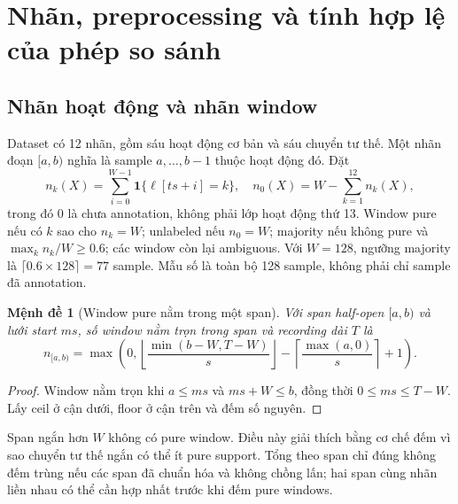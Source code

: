 \documentclass[11pt,a4paper]{article}
\newcommand{\ind}{\mathbf 1}
\newtheorem{proposition}[definition]{Mệnh đề}
\theoremstyle{remark}
\begin{document}
\section{Nhãn, preprocessing và tính hợp lệ của phép so sánh}
\subsection{Nhãn hoạt động và nhãn window}
Dataset có 12 nhãn, gồm sáu hoạt động cơ bản và sáu chuyển tư thế. Một nhãn
đoạn $[a,b)$ nghĩa là sample $a,\ldots,b-1$ thuộc hoạt động đó. Đặt
\begin{equation}
 n_k(X)=\sum_{i=0}^{W-1}\ind\{\ell[ts+i]=k\},\quad
 n_0(X)=W-\sum_{k=1}^{12}n_k(X),
\end{equation}
trong đó $0$ là chưa annotation, không phải lớp hoạt động thứ 13.
Window pure nếu có $k$ sao cho $n_k=W$; unlabeled nếu $n_0=W$;
majority nếu không pure và $\max_k n_k/W\ge0.6$; các window còn lại
ambiguous. Với $W=128$, ngưỡng majority là $\lceil0.6\times128\rceil=77$
sample. Mẫu số là toàn bộ 128 sample, không phải chỉ sample đã annotation.

\begin{proposition}[Window pure nằm trong một span]
Với span half-open $[a,b)$ và lưới start $ms$, số window nằm trọn trong
span và recording dài $T$ là
\begin{equation}
 n_{[a,b)}=\max\left(0,
 \left\lfloor\frac{\min(b-W,T-W)}s\right\rfloor
 -\left\lceil\frac{\max(a,0)}s\right\rceil+1\right).
\end{equation}
\end{proposition}
\begin{proof}
Window nằm trọn khi $a\le ms$ và $ms+W\le b$, đồng thời
$0\le ms\le T-W$. Lấy ceil ở cận dưới, floor ở cận trên và đếm số nguyên.
\end{proof}
Span ngắn hơn $W$ không có pure window. Điều này giải thích bằng cơ chế
đếm vì sao chuyển tư thế ngắn có thể ít pure support. Tổng theo span chỉ
đúng không đếm trùng nếu các span đã chuẩn hóa và không chồng lấn; hai span
cùng nhãn liền nhau có thể cần hợp nhất trước khi đếm pure windows.
\end{document}
